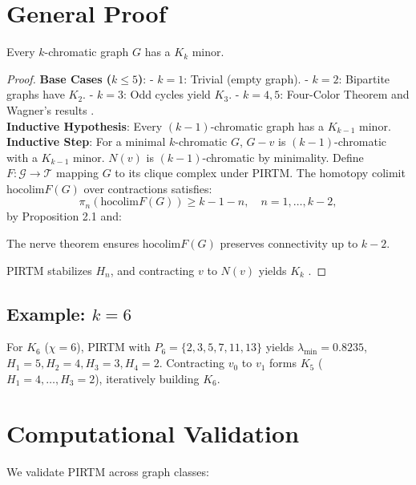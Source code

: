 \documentclass[12pt]{amsart}
\begin{document}
\section{General Proof}
\begin{theorem}
Every \( k \)-chromatic graph \( G \) has a \( K_k \) minor.
\end{theorem}
\begin{proof}
\textbf{Base Cases (\( k \leq 5 \))}:  
- \( k = 1 \): Trivial (empty graph).  
- \( k = 2 \): Bipartite graphs have \( K_2 \).  
- \( k = 3 \): Odd cycles yield \( K_3 \).  
- \( k = 4, 5 \): Four-Color Theorem and Wagner’s results \cite{wagner1937}. \\
\textbf{Inductive Hypothesis}: Every \( (k-1) \)-chromatic graph has a \( K_{k-1} \) minor. \\
\textbf{Inductive Step}: For a minimal \( k \)-chromatic \( G \), \( G - v \) is \( (k-1) \)-chromatic with a \( K_{k-1} \) minor. \( N(v) \) is \( (k-1) \)-chromatic by minimality. Define \( F: \mathcal{G} \to \mathcal{T} \) mapping \( G \) to its clique complex under PIRTM. The homotopy colimit \( \text{hocolim} F(G) \) over contractions satisfies:
\[
\pi_n(\text{hocolim} F(G)) \geq k - 1 - n, \quad n = 1, \ldots, k-2,
\]
by Proposition 2.1 and:
\begin{lemma}[Lemma 4.1]
The nerve theorem \cite{bousfield1977} ensures \( \text{hocolim} F(G) \) preserves connectivity up to \( k-2 \).
\end{lemma}
PIRTM stabilizes \( H_n \), and contracting \( v \) to \( N(v) \) yields \( K_k \) \cite{robertson1993}.
\end{proof}
\subsection{Example: \( k = 6 \)}
For \( K_6 \) (\( \chi = 6 \)), PIRTM with \( P_6 = \{2, 3, 5, 7, 11, 13\} \) yields \( \lambda_{\text{min}} = 0.8235 \), \( H_1 = 5, H_2 = 4, H_3 = 3, H_4 = 2 \). Contracting \( v_0 \) to \( v_1 \) forms \( K_5 \) (\( H_1 = 4, \ldots, H_3 = 2 \)), iteratively building \( K_6 \).

\section{Computational Validation}
We validate PIRTM across graph classes:
\end{document}
